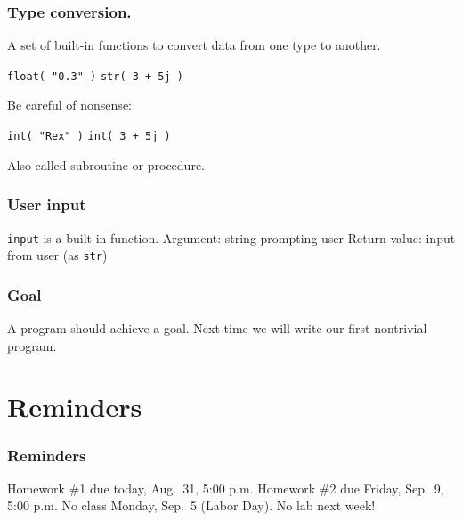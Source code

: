 \documentclass[11pt]{beamer}
\begin{document}
\begin{frame}
  \frametitle{Type conversion.}
  \Enlarge

  \begin{itemize}
  \myitem  A set of built-in functions to convert data from one type to another. \pause
    \begin{itemize}
    \mysubitem  \texttt{float( "0.3" )}
    \mysubitem  \texttt{str( 3 + 5j )}
    \end{itemize} \pause
  \myitem  Be careful of nonsense:
    \begin{itemize}
    \mysubitem  \texttt{int( "Rex" )}
    \mysubitem  \texttt{int( 3 + 5j )}
    \end{itemize}
  \myitem  Also called subroutine or procedure.
  \end{itemize}
\end{frame}

\begin{frame}
  \frametitle{User input}
  \Enlarge

  \begin{itemize}
  \myitem  \texttt{input} is a built-in function. \pause
  \myitem  Argument:  string prompting user \pause
  \myitem  Return value:  input from user (as \texttt{str})
  \end{itemize}
\end{frame}

\begin{frame}
  \frametitle{Goal}
  \Enlarge

  \begin{itemize}
  \myitem  A program should achieve a goal. \pause
  \myitem  Next time we will write our first nontrivial program.
  \end{itemize}
\end{frame}

\section{Reminders}

\begin{frame}
  \frametitle{Reminders}
  \Enlarge

  \begin{itemize}
  \myitem  Homework \#1 due today, Aug.\ 31, 5:00 p.m.
  \myitem  Homework \#2 due Friday, Sep.\ 9, 5:00 p.m.
  \myitem  No class Monday, Sep.\ 5 (Labor Day).
  \myitem  No lab next week!
  \end{itemize}
\end{frame}
\end{document}
